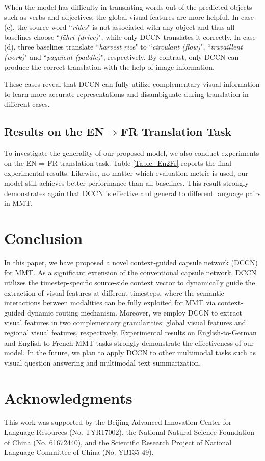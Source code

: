 \documentclass[sigconf]{acmart}
\begin{document}
When the model has difficulty in translating words out of the predicted objects such as verbs and adjectives, the global visual features are more helpful. In case (c), the source word ``\emph{rides}" is not associated with any object and thus all baselines choose ``\emph{fährt (drive)}", while only DCCN translates it correctly. In case (d), three baselines translate ``\emph{harvest rice}" to ``\emph{circulant (flow)}", ``\emph{travaillent (work)}" and ``\emph{pagaient (paddle)}", respectively. By contrast, only DCCN can produce the correct translation with the help of image information. 

These cases reveal that DCCN can fully utilize complementary visual information to learn more accurate representations and disambiguate during translation in different cases.




\subsection{Results on the EN$\Rightarrow$FR Translation Task}

To investigate the generality of our proposed model, we also conduct experiments on the EN$\Rightarrow$FR translation task. Table \ref{Table_En2Fr} reports the final experimental results. Likewise, no matter which evaluation metric is used, our model still achieves  better performance than all baselines. This result strongly demonstrates again that DCCN is effective and general to different language pairs in MMT.






\section{Conclusion}
In this paper,
we have proposed a novel context-guided capsule network (DCCN) for MMT. As a significant extension of the conventional capsule network, 
DCCN utilizes the timestep-specific source-side context vector to dynamically guide the extraction of visual features at different timesteps, where the semantic interactions between modalities can be fully exploited for MMT via context-guided dynamic routing mechanism. Moreover, we employ DCCN to extract visual features in two complementary granularities: global visual features and regional visual features, respectively. 
Experimental results on English-to-German and English-to-French MMT tasks strongly demonstrate the effectiveness of our model. 
In the future, 
we plan to apply DCCN to other multimodal tasks such as visual question answering and multimodal text summarization.


\section{Acknowledgments}
This work was supported by the Beijing Advanced Innovation Center for Language Resources (No. TYR17002), the National Natural Science Foundation of China (No. 61672440), and the Scientific Research Project of National Language Committee of China (No. YB135-49).



\balance


\appendix
\end{document}
